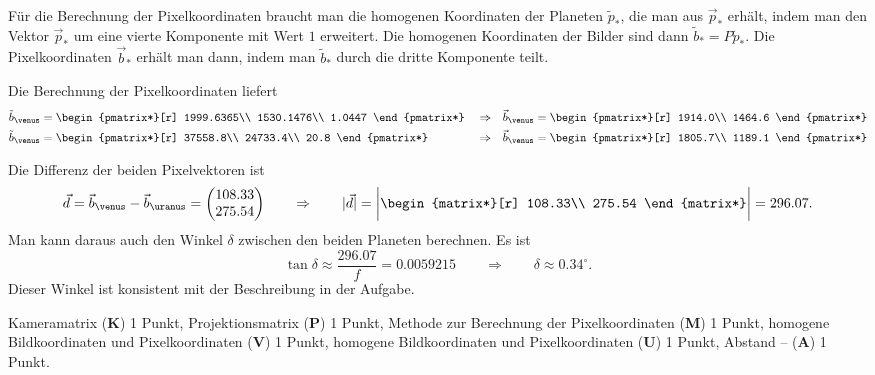 \begin{loesung}
Für die Berechnung der Pixelkoordinaten braucht man die homogenen Koordinaten
der Planeten $\tilde{p}_*$, die man aus $\vec{p}_*$ erhält, indem man 
den Vektor $\vec{p}_*$ um eine vierte Komponente mit Wert $1$ erweitert.
Die homogenen Koordinaten der Bilder sind dann $\tilde{b}_* = P \tilde{p}_*$.
Die Pixelkoordinaten $\vec{b}_*$ erhält man dann, indem man $\tilde{b}_*$
durch die dritte Komponente teilt.
\begin{teilaufgaben}
\item
Die Berechnung der Pixelkoordinaten liefert
\begin{align*}
\tilde{b}_{\venus}
&=
\begin{pmatrix*}[r]
   1999.6365\\
   1530.1476\\
      1.0447
\end{pmatrix*}
&&\Rightarrow&
\vec{b}_{\venus}
&=
\begin{pmatrix*}[r]
   1914.0\\
   1464.6
\end{pmatrix*}
\\
\tilde{b}_{\venus}
&=
\begin{pmatrix*}[r]
   37558.8\\
   24733.4\\
      20.8
\end{pmatrix*}
&&\Rightarrow&
\vec{b}_{\venus}
&=
\begin{pmatrix*}[r]
  1805.7\\
  1189.1
\end{pmatrix*}
\end{align*}
\item
Die Differenz der beiden Pixelvektoren ist
\[
\vec{d}
=
\vec{b}_{\venus}-\vec{b}_{\uranus}
=
\begin{pmatrix}
   108.33\\
   275.54
\end{pmatrix}
\qquad\Rightarrow\qquad
|\vec{d}|
=
\biggl|
\begin{matrix*}[r]
   108.33\\
   275.54
\end{matrix*}
\biggr|
=
296.07.
\]
Man kann daraus auch den Winkel $\delta$ zwischen den beiden Planeten
berechnen.
Es ist
\[
\tan\delta
\approx
\frac{296.07}{f}
=
0.0059215
\qquad\Rightarrow\qquad
\delta \approx 0.34^\circ.
\]
Dieser Winkel ist konsistent mit der Beschreibung in der Aufgabe.
\qedhere
\end{teilaufgaben}
\end{loesung}

\begin{bewertung}
\end{bewertung}
\begin{bewertung}
Kameramatrix ({\bf K}) 1 Punkt,
Projektionsmatrix ({\bf P}) 1 Punkt,
Methode zur Berechnung der Pixelkoordinaten ({\bf M}) 1 Punkt,
homogene Bildkoordinaten und Pixelkoordinaten \venus{} ({\bf V}) 1 Punkt,
homogene Bildkoordinaten und Pixelkoordinaten \uranus{} ({\bf U}) 1 Punkt,
Abstand \venus--\uranus{} ({\bf A}) 1 Punkt.
\end{bewertung}

